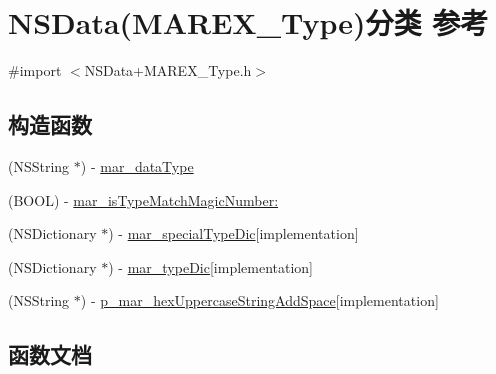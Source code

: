 \hypertarget{category_n_s_data_07_m_a_r_e_x___type_08}{}\section{N\+S\+Data(M\+A\+R\+E\+X\+\_\+\+Type)分类 参考}
\label{category_n_s_data_07_m_a_r_e_x___type_08}


{\ttfamily \#import $<$N\+S\+Data+\+M\+A\+R\+E\+X\+\_\+\+Type.\+h$>$}

\subsection*{构造函数}
\begin{DoxyCompactItemize}
\item 
(N\+S\+String $\ast$) -\/ \hyperlink{category_n_s_data_07_m_a_r_e_x___type_08_a11922531b318f260e1d02e72572df244}{mar\+\_\+data\+Type}
\item 
(B\+O\+OL) -\/ \hyperlink{category_n_s_data_07_m_a_r_e_x___type_08_a97dd2ec6a0b95d64aedde5b0d88f3bab}{mar\+\_\+is\+Type\+Match\+Magic\+Number\+:}
\item 
(N\+S\+Dictionary $\ast$) -\/ \hyperlink{category_n_s_data_07_m_a_r_e_x___type_08_a39a1d3c794f4f5a83a16a5ba4179e453}{mar\+\_\+special\+Type\+Dic}{\ttfamily  \mbox{[}implementation\mbox{]}}
\item 
(N\+S\+Dictionary $\ast$) -\/ \hyperlink{category_n_s_data_07_m_a_r_e_x___type_08_abea7eef6d76dc83c1ea6e98f7b619419}{mar\+\_\+type\+Dic}{\ttfamily  \mbox{[}implementation\mbox{]}}
\item 
(N\+S\+String $\ast$) -\/ \hyperlink{category_n_s_data_07_m_a_r_e_x___type_08_a9ae854c7ee468daaf034db65756d0d57}{p\+\_\+mar\+\_\+hex\+Uppercase\+String\+Add\+Space}{\ttfamily  \mbox{[}implementation\mbox{]}}
\end{DoxyCompactItemize}


\subsection{函数文档}
\mbox{\label{category_n_s_data_07_m_a_r_e_x___type_08_a11922531b318f260e1d02e72572df244}} 
